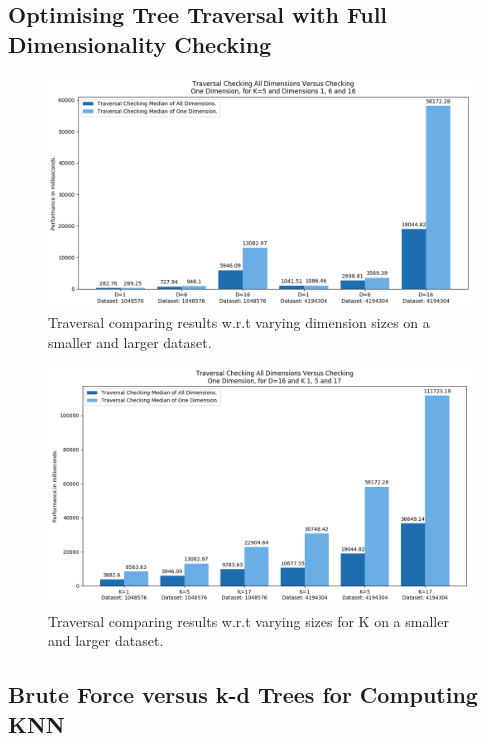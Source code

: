 \subsection{Optimising Tree Traversal with Full Dimensionality Checking}

\begin{figure}[H]
\centering
\includegraphics[width=1\textwidth]{pics/plot-figs/trav-k5-2.png}
\caption{Traversal comparing results w.r.t varying dimension sizes on a smaller and larger dataset.}
\end{figure}


\begin{figure}[H]
\centering
\includegraphics[width=1\textwidth]{pics/plot-figs/trav-d16.png}
\caption{Traversal comparing results w.r.t varying sizes for K on a smaller and larger dataset.}
\end{figure}





\subsection{Brute Force versus k-d Trees for Computing KNN}







